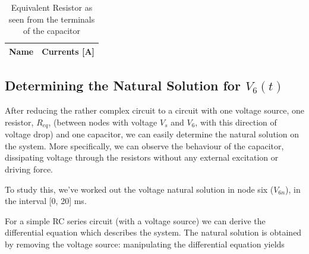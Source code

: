 \begin{table}[h]
  \centering
  \begin{tabular}{|l|r|}
    \hline    
    {\bf Name} & {\bf Currents [A]} \\ \hline
    
  \end{tabular}
  \caption{Equivalent Resistor as seen from the terminals of the capacitor}
  \label{tab:Req}
\end{table}


\subsection{Determining the Natural Solution for $V_6(t)$}

After reducing the rather complex circuit to a circuit with one voltage source, one resistor, $R_{eq}$, (between nodes with voltage $V_s$ and $V_6$, with this direction of voltage drop) and one capacitor, we can easily determine the natural solution on the system. More specifically, we can observe the behaviour of the capacitor, dissipating voltage through the resistors without any external excitation or driving force. 

To study this, we've worked out the voltage natural solution in node six ($V_{6n}$), in the interval [0, 20] ms.

For a simple RC series circuit (with a voltage source) we can derive the differential equation which describes the system. The natural solution is obtained by removing the voltage source: manipulating the differential equation yields 









